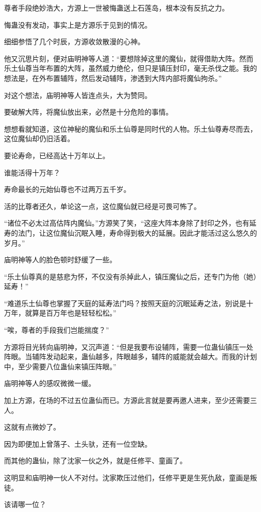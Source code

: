 \begin{this_body}
尊者手段绝妙浩大，方源上一世被悔蛊送上石莲岛，根本没有反抗之力。

悔蛊没有发动，事实上是方源乐于见到的情况。

细细参悟了几个时辰，方源收敛散漫的心神。

他又沉思片刻，便对庙明神等人道：“要想除掉这里的魔仙，就得借助大阵。然而乐土仙尊当年布置的大阵，虽然威力绝伦，但只是镇压封印，毫无杀伐之能。我的想法是，在外布置辅阵，然后发动辅阵，渗透到大阵内部将魔仙拘杀。”

对这个想法，庙明神等人皆连点头，大为赞同。

要破解大阵，将魔仙放出来，必然是十分危险的事情。

想想看就知道，这位神秘的魔仙和乐土仙尊是同时代的人物。乐土仙尊寿尽而去，这位魔仙却仍旧活着。

要论寿命，已经高达十万年以上。

谁能活得十万年？

寿命最长的元始仙尊也不过两万五千岁。

活的比尊者还久，单论这一点，这位魔仙就已经是可畏可怖了。

“诸位不必太过高估阵内魔仙。”方源笑了笑，“这座大阵本身除了封印之外，也有延寿的法门，让这位魔仙沉眠入睡，寿命得到极大的延展。因此才能活过这么悠久的岁月。”

庙明神等人的脸色顿时舒缓了一些。

“乐土仙尊真的是慈悲为怀，不仅没有杀掉此人，镇压魔仙之后，还专门为他（她）延寿！”

“难道乐土仙尊也掌握了天庭的延寿法门吗？按照天庭的沉眠延寿之法，别说是十万年，就算是百万年也是轻轻松松。”

“唉，尊者的手段我们岂能揣度？”

方源将目光转向庙明神，又沉声道：“但是我要布设辅阵，需要一位蛊仙镇压一处阵眼。当辅阵发动起来，蛊仙越多，阵眼越多，辅阵的威能就会越大。而我的计划中，至少需要八位蛊仙来镇压阵眼。”

庙明神等人的感叹微微一缓。

加上方源，在场的不过五位蛊仙而已。方源此言就是要再邀人进来，至少还需要三人。

这就有点微妙了。

因为即便加上曾落子、土头驮，还有一位空缺。

而其他的蛊仙，除了沈家一伙之外，就是任修平、童画了。

这明显和庙明神一伙人不对付。沈家欺压过他们，任修平更是生死仇敌，童画是叛徒。

该请哪一位？


\end{this_body}
